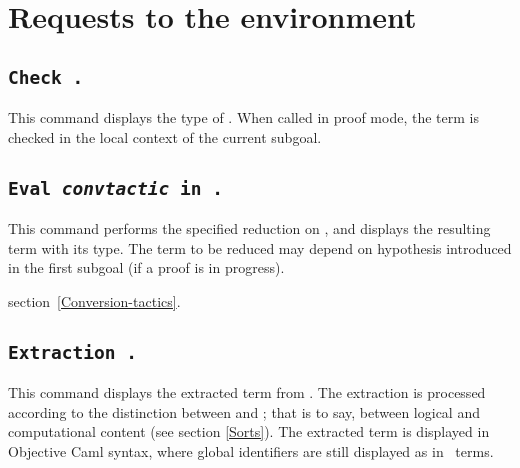 
\section{Requests to the environment}

\subsection[\tt Check {\term}.]{\tt Check {\term}.\label{Check}
}
This command displays the type of {\term}. When called in proof mode, 
the term is checked in the local context of the current subgoal.

\subsection[\tt Eval {\rm\sl convtactic} in {\term}.]{\tt Eval {\rm\sl convtactic} in {\term}.}

This command performs the specified reduction on {\term}, and displays
the resulting term with its type. The term to be reduced may depend on
hypothesis introduced in the first subgoal (if a proof is in
progress).

\SeeAlso section~\ref{Conversion-tactics}.

\subsection[\tt Extraction \term.]{\tt Extraction \term.\label{ExtractionTerm}
} 
This command displays the extracted term from
{\term}. The extraction is processed according to the distinction
between {\Set} and {\Prop}; that is to say, between logical and
computational content (see section \ref{Sorts}). The extracted term is
displayed in Objective Caml syntax, where global identifiers are still
displayed as in \Coq\ terms.

